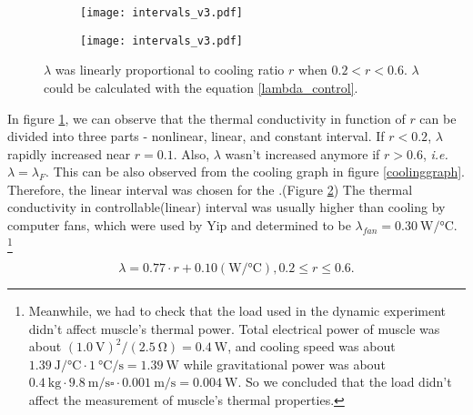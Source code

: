 \begin{figure}[t]
	\begin{subfigure}[t]{0.52\linewidth}
		\centering\texttt{[image: intervals\_v3.pdf]}
		\caption{\label{dynamic_proportional}}
	\end{subfigure}%
	\begin{subfigure}[t]{0.39\linewidth}
		\centering\texttt{[image: intervals\_v3.pdf]}
		\caption{\label{linear_interval}}
	\end{subfigure}
	\caption[Analysis of the dynamic experiment]{ $\lambda$ was linearly proportional to cooling ratio $r$ when $0.2<r<0.6$.   $\lambda$ could be calculated with the equation \eqref{lambda_control}.}
	\label{analysis_dynamic}
\end{figure}

In figure \ref{dynamic_proportional}, we can observe that the thermal conductivity in function of $r$ can be divided into three parts - nonlinear, linear, and constant interval. If $r<0.2$, $\lambda$ rapidly increased near $r=0.1$. Also, $\lambda$ wasn't increased anymore if $r>0.6$, {\it i.e.} $\lambda = \lambda_{F}$. This can be also observed from the cooling graph in figure \ref{coolinggraph}.
Therefore, the linear interval was chosen for the \Apcnospace.(Figure \ref{linear_interval}) The thermal conductivity in controllable(linear) interval was usually higher than cooling by computer fans, which were used by Yip \etalspace \cite{yip} and determined to be $\lambda_{fan}=\SI{0.30}{\watt\per\degreeCelsius}$.
\footnote{
	Meanwhile, we had to check that the load used in the dynamic experiment didn't affect muscle's thermal power. 
	Total electrical power of muscle was about $(\SI{1.0}{\volt})^2/(\SI{2.5}{\ohm})=\SI{0.4}{\watt}$, and cooling speed was about $\SI{1.39}{\joule\per\degreeCelsius} \cdot \SI{1}{\degreeCelsius\per\second}=\SI{1.39}{\watt}$ while gravitational power was about  $\SI{0.4}{\kilo\gram} \cdot  \SI{9.8}{\meter\per\second\square} \cdot \SI{0.001}{\meter\per\second}=\SI{0.004}{\watt}$. So we concluded that the load didn't affect the measurement of muscle's thermal properties.
}

\begin{equation} \label{lambda_control}
\lambda = 0.77\cdot r + 0.10 (\si{\watt\per\degreeCelsius}), 0.2\leq r \leq 0.6.
\end{equation}


